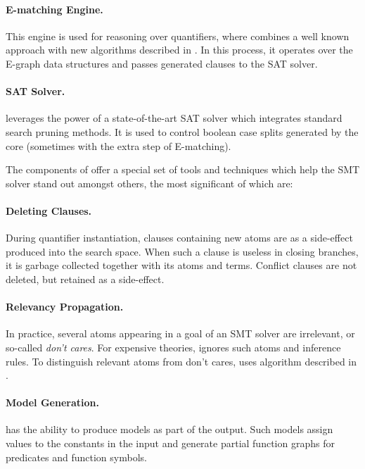 \paragraph{E-matching Engine.}
This engine is used for reasoning over quantifiers, where \ziii combines a well known approach with new algorithms described in \cite{z3:e-match}.
In this process, it operates over the E-graph data structures and passes generated clauses to the SAT solver.

\paragraph{SAT Solver.}
\ziii leverages the power of a state-of-the-art SAT solver which integrates standard search pruning methods.
It is used to control boolean case splits generated by the \ziii core (sometimes with the extra step of E-matching).

\gap

The components of \ziii offer a special set of tools and techniques which help the SMT solver stand out amongst others, the most significant of which are:

\paragraph{Deleting Clauses.}
During quantifier instantiation, clauses containing new atoms are as a side-effect produced into the search space.
When such a clause is useless in closing branches, it is garbage collected together with its atoms and terms.
Conflict clauses are not deleted, but retained as a side-effect.

\paragraph{Relevancy Propagation.}
In practice, several atoms appearing in a goal of an SMT solver are irrelevant, or so-called \emph{don’t cares}.
For expensive theories, \ziii ignores such atoms and inference rules.
To distinguish relevant atoms from don’t cares, \ziii uses algorithm described in \cite{z3:rele}.

\paragraph{Model Generation.}
\ziii has the ability to produce models as part of the output.
Such models assign values to the constants in the input and generate partial function graphs for predicates and function symbols.

